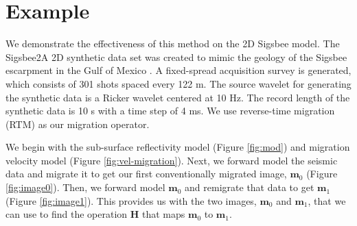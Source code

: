 

%



\section{Example}

    We demonstrate the effectiveness of this method on the 2D Sigsbee model. %
    The Sigsbee2A 2D synthetic data set was created to mimic the geology of the Sigsbee escarpment in the Gulf of Mexico \cite[]{sigsbee}.
    A fixed-spread acquisition survey is generated, which consists of 301 shots spaced every 122 m.
    The source wavelet for generating the synthetic data is a Ricker wavelet centered at 10 Hz.
    The record length of the synthetic data is 10 s with a time step of 4 ms.
We use reverse-time migration (RTM) as our migration operator.

    We begin with the sub-surface reflectivity model (Figure \ref{fig:mod}) and migration velocity model (Figure \ref{fig:vel-migration}).
    Next, we forward model the seismic data and migrate it to get our first conventionally migrated image, $\mathbf{m}_0$ (Figure \ref{fig:image0}). 
    Then, we forward model $\mathbf{m}_0$ and remigrate that data to get $\mathbf{m}_1$ (Figure \ref{fig:image1}).
    This provides us with the two images, $\mathbf{m}_0$ and $\mathbf{m}_1$, that we can use to find the operation $\mathbf{H}$ that maps $\mathbf{m}_0$ to $\mathbf{m}_1$.

